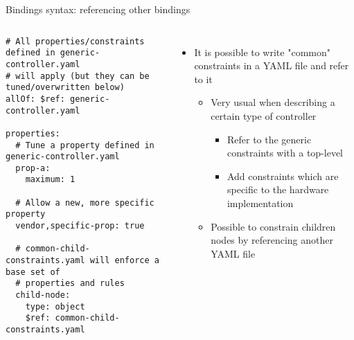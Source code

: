\begin{frame}[fragile]{Bindings syntax: referencing other bindings}
  \begin{columns}
    \begin{block}{}
      {\fontsize{5}{6}\selectfont
\begin{verbatim}
# All properties/constraints defined in generic-controller.yaml
# will apply (but they can be tuned/overwritten below)
allOf: $ref: generic-controller.yaml

properties:
  # Tune a property defined in generic-controller.yaml
  prop-a:
    maximum: 1

  # Allow a new, more specific property
  vendor,specific-prop: true

  # common-child-constraints.yaml will enforce a base set of
  # properties and rules
  child-node:
    type: object
    $ref: common-child-constraints.yaml
\end{verbatim}
      }
    \end{block}
    \begin{itemize}
    \item It is possible to write "common" constraints in a YAML file
      and refer to it
      \begin{itemize}
      \item Very usual when describing a certain type of controller
        \begin{itemize}
        \item Refer to the generic constraints with a top-level
        \item Add constraints which are specific to the hardware
          implementation
        \end{itemize}
      \item Possible to constrain children nodes by referencing another
        YAML file
      \end{itemize}
    \end{itemize}
  \end{columns}
\end{frame}

